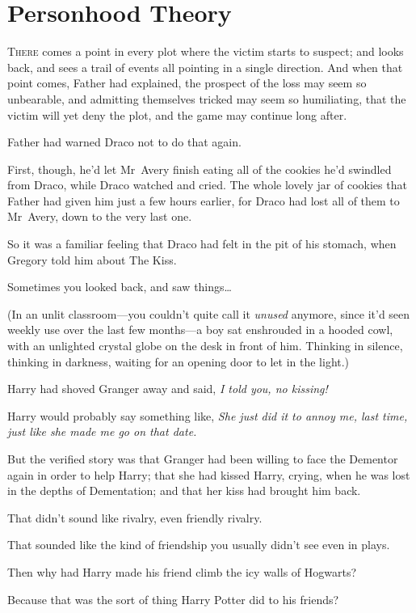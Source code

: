 \chapter{Personhood Theory}

\lettrine{T}{here} comes a point in every plot where the victim starts to suspect; and looks back, and sees a trail of events all pointing in a single direction. And when that point comes, Father had explained, the prospect of the loss may seem so unbearable, and admitting themselves tricked may seem so humiliating, that the victim will yet deny the plot, and the game may continue long after.

Father had warned Draco not to do that again.

First, though, he'd let Mr~Avery finish eating all of the cookies he'd swindled from Draco, while Draco watched and cried. The whole lovely jar of cookies that Father had given him just a few hours earlier, for Draco had lost all of them to Mr~Avery, down to the very last one.

So it was a familiar feeling that Draco had felt in the pit of his stomach, when Gregory told him about The Kiss.

Sometimes you looked back, and saw things{\ldots}

(In an unlit classroom—you couldn't quite call it \emph{unused} anymore, since it'd seen weekly use over the last few months—a boy sat enshrouded in a hooded cowl, with an unlighted crystal globe on the desk in front of him. Thinking in silence, thinking in darkness, waiting for an opening door to let in the light.)

Harry had shoved Granger away and said, \emph{I told you, no kissing!}

Harry would probably say something like, \emph{She just did it to annoy me, last time, just like she made me go on that date.}

But the verified story was that Granger had been willing to face the Dementor again in order to help Harry; that she had kissed Harry, crying, when he was lost in the depths of Dementation; and that her kiss had brought him back.

That didn't sound like rivalry, even friendly rivalry.

That sounded like the kind of friendship you usually didn't see even in plays.

Then why had Harry made his friend climb the icy walls of Hogwarts?

Because that was the sort of thing Harry Potter did to his friends?

